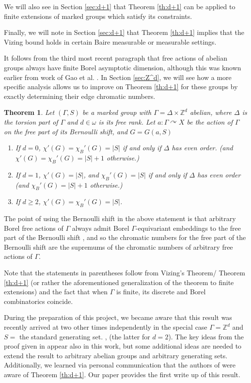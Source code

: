 \documentclass[10pt,a4paper]{article}
\newcommand{\0}{\varnothing}
\newcommand{\Z}{\mathbb{Z}}
\newtheorem{theorem}{Theorem}
\begin{document}
We will also see in Section \ref{sec:d+1} that Theorem \ref{th:d+1} can be applied to finite extensions of marked groups which satisfy its constraints.

Finally, we will note in Section \ref{sec:d+1} that Theorem \ref{th:d+1} implies that the Vizing bound holds in certain Baire measurable or measurable settings.

It follows from the third most recent paragraph that free actions of abelian groups always have finite Borel asymptotic dimension, although this was known earlier from work of Gao et al. \cite{toast}. In Section \ref{sec:Z^d}, we will see how a more specific analysis allows us to improve on Theorem \ref{th:d+1} for these groups by exactly determining their edge chromatic numbers.


\begin{theorem}\label{th:Z^d}
Let $(\Gamma,S)$ be a marked group with $\Gamma = \Delta \times \Z^d$ abelian, where $\Delta$ is the torsion part of $\Gamma$ and $d \in \omega$ is its free rank. Let $a:\Gamma \curvearrowright X$ be the action of $\Gamma$ on the free part of its Bernoulli shift, and $G = G(a,S)$
\begin{enumerate}
    \item If $d = 0$, $\chi'(G) = \chi_B'(G) = |S|$ if and only if $\Delta$ has even order. (and $\chi'(G) = \chi_B'(G) = |S|+1$ otherwise.)
    \item If $d = 1$, $\chi'(G) = |S|$, and $\chi_B'(G) = |S|$ if and only if $\Delta$ has even order (and $\chi_B'(G) = |S|+1$ otherwise.)
    \item If $d \geq 2$, $\chi'(G) = \chi_B'(G) = |S|$.
\end{enumerate}
\end{theorem}


The point of using the Bernoulli shift in the above statement is that arbitrary Borel free actions of $\Gamma$ always admit Borel $\Gamma$-equivariant embeddings to the free part of the Bernoulli shift \cite{JKL}, and so the chromatic numbers for the free part of the Bernoulli shift are the supremums of the chromatic numbers of arbitrary free actions of $\Gamma$.

Note that the statements in parentheses follow from Vizing's Theorem/ Theorem \ref{th:d+1} (or rather the aforementioned generalization of the theorem to finite extensions)  and the fact that when $\Gamma$ is finite, its discrete and Borel combinatorics coincide. 

During the preparation of this project, we became aware that this result was recently arrived at two other times independently in the special case $\Gamma = \Z^d$ and $S =$ the standard generating set. \cite{GR},\cite{BHT} (the latter for $d = 2$). The key ideas from the proof given in \cite{GR} appear also in this work, but some additional ideas are needed to extend the result to arbitrary abelian groups and arbitrary generating sets. Additionally, we learned via personal communication that the authors of \cite{GR} were aware of Theorem \ref{th:d+1}. Our paper provides the first write up of this result. 
\end{document}
